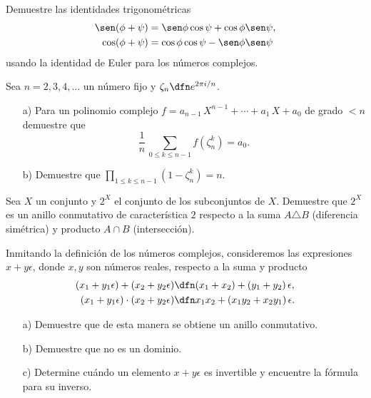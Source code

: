 \begin{ejercicio}
  Demuestre las identidades trigonométricas
  \begin{align*}
    \sen (\phi + \psi) & = \sen\phi \cos\psi + \cos\phi \sen\psi,\\
    \cos (\phi + \psi) & = \cos\phi \cos\psi - \sen\phi \sen\psi
  \end{align*}
  usando la identidad de Euler para los números complejos.
\end{ejercicio}

\begin{ejercicio}
  Sea $n = 2,3,4,\ldots$ un número fijo y $\zeta_n \dfn e^{2\pi i/n}$.

  \begin{enumerate}
  \item[a)] Para un polinomio complejo
    $f = a_{n-1}\,X^{n-1} + \cdots + a_1\,X + a_0$ de grado $< n$ demuestre que
    $$\frac{1}{n}\,\sum_{0\le k \le n-1} f (\zeta_n^k) = a_0.$$

  \item[b)] Demuestre que
    $\prod\limits_{1\le k\le n-1} (1-\zeta_n^k) = n$.
  \end{enumerate}
\end{ejercicio}

\begin{ejercicio}
  Sea $X$ un conjunto y $2^X$ el conjunto de los subconjuntos de $X$. Demuestre
  que $2^X$ es un anillo conmutativo de característica $2$ respecto a la suma
  $A\triangle B$ (diferencia simétrica) y producto $A\cap B$ (intersección).
\end{ejercicio}

\begin{ejercicio}
  Inmitando la definición de los números complejos, consideremos las expresiones
  $x + y\epsilon$, donde $x,y$ son números reales, respecto a la suma y producto
  \begin{align*}
    (x_1 + y_1\epsilon) + (x_2 + y_2\epsilon) & \dfn (x_1+x_2) + (y_1 + y_2)\,\epsilon,\\
    (x_1 + y_1\epsilon) \cdot (x_2 + y_2\epsilon) & \dfn x_1 x_2 + (x_1 y_2 + x_2 y_1)\,\epsilon.
  \end{align*}

  \begin{enumerate}
  \item[a)] Demuestre que de esta manera se obtiene un anillo conmutativo.

  \item[b)] Demuestre que no es un dominio.

  \item[c)] Determine cuándo un elemento $x + y\epsilon$ es invertible y
    encuentre la fórmula para su inverso.
  \end{enumerate}
\end{ejercicio}

